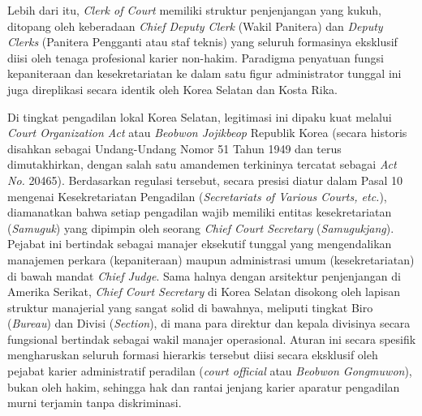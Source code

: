 \documentclass[12pt, a4paper]{article}
\begin{document}
Lebih dari itu, \textit{Clerk of Court} memiliki struktur penjenjangan yang kukuh, ditopang oleh keberadaan \textit{Chief Deputy Clerk} (Wakil Panitera) dan \textit{Deputy Clerks} (Panitera Pengganti atau staf teknis) yang seluruh formasinya eksklusif diisi oleh tenaga profesional karier non-hakim. Paradigma penyatuan fungsi kepaniteraan dan kesekretariatan ke dalam satu figur administrator tunggal ini juga direplikasi secara identik oleh Korea Selatan dan Kosta Rika. 

Di tingkat pengadilan lokal Korea Selatan, legitimasi ini dipaku kuat melalui \textit{Court Organization Act} atau \textit{Beobwon Jojikbeop} Republik Korea (secara historis disahkan sebagai Undang-Undang Nomor 51 Tahun 1949 dan terus dimutakhirkan, dengan salah satu amandemen terkininya tercatat sebagai \textit{Act No.} 20465). Berdasarkan regulasi tersebut, secara presisi diatur dalam Pasal 10 mengenai Kesekretariatan Pengadilan (\textit{Secretariats of Various Courts, etc.}), diamanatkan bahwa setiap pengadilan wajib memiliki entitas kesekretariatan (\textit{Samuguk}) yang dipimpin oleh seorang \textit{Chief Court Secretary} (\textit{Samugukjang}). Pejabat ini bertindak sebagai manajer eksekutif tunggal yang mengendalikan manajemen perkara (kepaniteraan) maupun administrasi umum (kesekretariatan) di bawah mandat \textit{Chief Judge}. Sama halnya dengan arsitektur penjenjangan di Amerika Serikat, \textit{Chief Court Secretary} di Korea Selatan disokong oleh lapisan struktur manajerial yang sangat solid di bawahnya, meliputi tingkat Biro (\textit{Bureau}) dan Divisi (\textit{Section}), di mana para direktur dan kepala divisinya secara fungsional bertindak sebagai wakil manajer operasional. Aturan ini secara spesifik mengharuskan seluruh formasi hierarkis tersebut diisi secara eksklusif oleh pejabat karier administratif peradilan (\textit{court official} atau \textit{Beobwon Gongmuwon}), bukan oleh hakim, sehingga hak dan rantai jenjang karier aparatur pengadilan murni terjamin tanpa diskriminasi.
\end{document}
